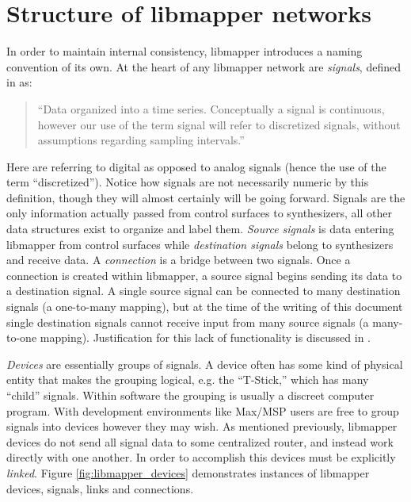 	\section{Structure of libmapper networks} %
	\label{sec:structure_of_libmapper_networks}

In order to maintain internal consistency, libmapper introduces a naming convention of its own. At the heart of any libmapper network are \emph{signals}, defined in  as:
\begin{quote}
``Data organized into a time series. Conceptually a signal is continuous, however our use of the term signal will refer to discretized signals, without assumptions regarding sampling intervals.''
\end{quote}
Here  are referring to digital as opposed to analog signals (hence the use of the term ``discretized''). Notice how signals are not necessarily numeric by this definition, though they will almost certainly will be going forward. Signals are the only information actually passed from control surfaces to synthesizers, all other data structures exist to organize and label them. \emph{Source signals} is data entering libmapper from control surfaces while \emph{destination signals} belong to synthesizers and receive data. A \emph{connection} is a bridge between two signals. Once a connection is created within libmapper, a source signal begins sending its data to a destination signal. A single source signal can be connected to many destination signals (a one-to-many mapping), but at the time of the writing of this document single destination signals cannot receive input from many source signals (a many-to-one mapping). Justification for this lack of functionality is discussed in .

\emph{Devices} are essentially groups of signals. A device often has some kind of physical entity that makes the grouping logical, e.g. the ``T-Stick,'' which has many ``child'' signals. Within software the grouping is usually a discreet computer program. With development environments like Max/MSP users are free to group signals into devices however they may wish. As mentioned previously, libmapper devices do not send all signal data to some centralized router, and instead work directly with one another. In order to accomplish this devices must be explicitly \emph{linked}. Figure \ref{fig:libmapper_devices} demonstrates instances of libmapper devices, signals, links and connections.


